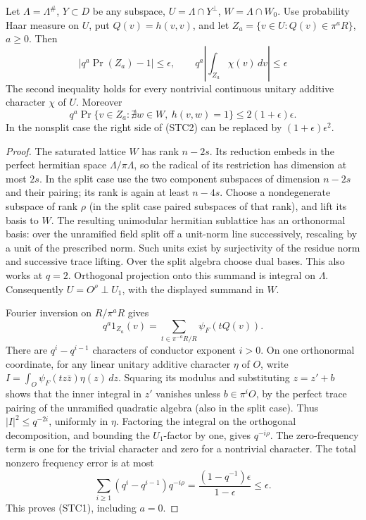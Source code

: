 \begin{lemma}
\label{lem:flag-second-type-fourier}
Let \(\Lambda=\Lambda^\#\), \(Y\subset D\) be any subspace,
\(U=\Lambda\cap Y^\perp\), \(W=\Lambda\cap W_0\).
Use probability Haar measure on \(U\), put \(Q(v)=h(v,v)\),
and let \(Z_a=\{v\in U:Q(v)\in\pi^a R\}\), \(a\ge0\).
Then
\[
 \left|q^a\Pr(Z_a)-1\right|\le\epsilon,\qquad
 q^a\left|\int_{Z_a}\chi(v)\,dv\right|\le\epsilon
 \tag{STC1}
\]
The second inequality holds for every nontrivial continuous
unitary additive character \(\chi\) of \(U\).
Moreover
\[
 q^a\Pr\{v\in Z_a:\nexists w\in W,\ h(v,w)=1\}
 \le 2(1+\epsilon)\epsilon .                         \tag{STC2}
\]
In the nonsplit case the right side of (STC2) can be replaced
by \((1+\epsilon)\epsilon^2\).
\end{lemma}
\begin{proof}
The saturated lattice \(W\) has rank \(n-2s\).
Its reduction embeds in the perfect hermitian space
\(\Lambda/\pi\Lambda\), so the radical of its restriction
has dimension at most \(2s\). In the split case use the
two component subspaces of dimension \(n-2s\) and their
pairing; its rank is again at least \(n-4s\).
Choose a nondegenerate subspace of rank \(\rho\) (in the
split case paired subspaces of that rank), and lift its
basis to \(W\). The resulting unimodular hermitian
sublattice has an orthonormal basis: over the unramified
field split off a unit-norm line successively, rescaling
by a unit of the prescribed norm. Such units exist by
surjectivity of the residue norm and successive trace
lifting. Over the split algebra choose dual bases.
This also works at \(q=2\). Orthogonal projection onto
this summand is integral on \(\Lambda\). Consequently
\(U=O^\rho\perp U_1\), with the displayed summand in \(W\).

Fourier inversion on \(R/\pi^a R\) gives
\[
 q^a 1_{Z_a}(v)=\sum_{t\in\pi^{-a}R/R}\psi_F(t Q(v)).
\]
There are \(q^i-q^{i-1}\) characters of conductor exponent
\(i>0\). On one orthonormal coordinate, for any linear
unitary additive character \(\eta\) of \(O\), write
\(I=\int_O\psi_F(t z\bar z)\eta(z)\,dz\).
Squaring its modulus and substituting \(z=z'+b\) shows
that the inner integral in \(z'\) vanishes unless
\(b\in\pi^i O\), by the perfect trace pairing of the
unramified quadratic algebra (also in the split case).
Thus \(|I|^2\le q^{-2i}\), uniformly in \(\eta\).
Factoring the integral on the orthogonal decomposition,
and bounding the \(U_1\)-factor by one, gives \(q^{-i\rho}\).
The zero-frequency term is one for the trivial character
and zero for a nontrivial character. The total nonzero
frequency error is at most
\[
 \sum_{i\ge1}(q^i-q^{i-1})q^{-i\rho}
 =\frac{(1-q^{-1})\epsilon}{1-\epsilon}\le\epsilon .
\]
This proves (STC1), including \(a=0\).


\end{proof}
